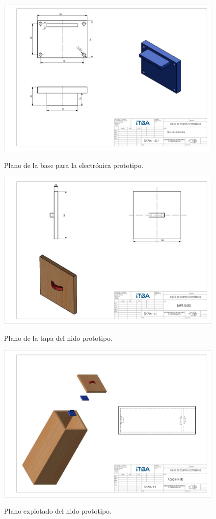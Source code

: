 \begin{figure}[H]
	\centering
	\includegraphics[width=\linewidth]{ImagenesApendice/Base_electronica_plano}
	\label{fig:Base_electronica_plano}
	\caption{Plano de la base para la electr\'onica prototipo.}
\end{figure}

\begin{figure}[H]
	\centering
	\includegraphics[width=\linewidth]{ImagenesApendice/tapa_nido_plano}
	\label{fig:tapa_nido_plano}
	\caption{Plano de la tapa del nido prototipo.}
\end{figure}

\begin{figure}[H]
	\centering
	\includegraphics[width=\linewidth]{ImagenesApendice/explotado_nido}
	\label{fig:explotado_nido_plano}
	\caption{Plano explotado del nido prototipo.}
\end{figure}

